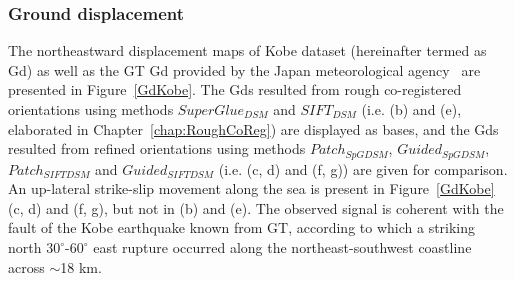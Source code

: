 \subsubsection{Ground displacement}
The northeastward displacement maps of Kobe dataset (hereinafter termed as Gd) as well as the \ac{GT} Gd provided by the Japan meteorological agency~\cite{ian1996morphological} are presented in Figure~\ref{GdKobe}. 
The Gds resulted from rough co-registered orientations using methods $SuperGlue_{DSM}$ and $SIFT_{DSM}$ (i.e. (b) and (e), elaborated in Chapter~\ref{chap:RoughCoReg}) are displayed as bases, and the Gds resulted from refined orientations using methods $Patch_{SpGDSM}$, $Guided_{SpGDSM}$, $Patch_{SIFTDSM}$ and $Guided_{SIFTDSM}$ (i.e. (c, d) and (f, g)) are given for comparison. 
An up-lateral strike-slip movement along the sea is present in Figure~\ref{GdKobe} (c, d) and (f, g), but not in (b) and (e). The observed signal is coherent with the fault of the Kobe earthquake known from \ac{GT}, according to which a striking north $30^{\circ}$-$60^{\circ}$ east rupture occurred along the northeast-southwest coastline across $ \sim $18 km.\\

